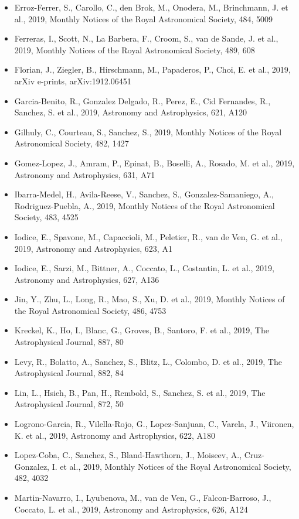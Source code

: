 \documentclass{letter}
\begin{document}
\begin{enumerate}
\begin{itemize}
\item Erroz-Ferrer, S., Carollo, C., den Brok, M., Onodera, M., Brinchmann, J. et al., 2019, Monthly Notices of the Royal Astronomical Society, 484, 5009
\item Ferreras, I., Scott, N., La Barbera, F., Croom, S., van de Sande, J. et al., 2019, Monthly Notices of the Royal Astronomical Society, 489, 608
\item Florian, J., Ziegler, B., Hirschmann, M., Papaderos, P., Choi, E. et al., 2019, arXiv e-prints, arXiv:1912.06451
\item Garcia-Benito, R., Gonzalez Delgado, R., Perez, E., Cid Fernandes, R., Sanchez, S. et al., 2019, Astronomy and Astrophysics, 621, A120
\item Gilhuly, C., Courteau, S., Sanchez, S., 2019, Monthly Notices of the Royal Astronomical Society, 482, 1427
\item Gomez-Lopez, J., Amram, P., Epinat, B., Boselli, A., Rosado, M. et al., 2019, Astronomy and Astrophysics, 631, A71
\item Ibarra-Medel, H., Avila-Reese, V., Sanchez, S., Gonzalez-Samaniego, A., Rodriguez-Puebla, A., 2019, Monthly Notices of the Royal Astronomical Society, 483, 4525
\item Iodice, E., Spavone, M., Capaccioli, M., Peletier, R., van de Ven, G. et al., 2019, Astronomy and Astrophysics, 623, A1
\item Iodice, E., Sarzi, M., Bittner, A., Coccato, L., Costantin, L. et al., 2019, Astronomy and Astrophysics, 627, A136
\item Jin, Y., Zhu, L., Long, R., Mao, S., Xu, D. et al., 2019, Monthly Notices of the Royal Astronomical Society, 486, 4753
\item Kreckel, K., Ho, I., Blanc, G., Groves, B., Santoro, F. et al., 2019, The Astrophysical Journal, 887, 80
\item Levy, R., Bolatto, A., Sanchez, S., Blitz, L., Colombo, D. et al., 2019, The Astrophysical Journal, 882, 84
\item Lin, L., Hsieh, B., Pan, H., Rembold, S., Sanchez, S. et al., 2019, The Astrophysical Journal, 872, 50
\item Logrono-Garcia, R., Vilella-Rojo, G., Lopez-Sanjuan, C., Varela, J., Viironen, K. et al., 2019, Astronomy and Astrophysics, 622, A180
\item Lopez-Coba, C., Sanchez, S., Bland-Hawthorn, J., Moiseev, A., Cruz-Gonzalez, I. et al., 2019, Monthly Notices of the Royal Astronomical Society, 482, 4032
\item Martin-Navarro, I., Lyubenova, M., van de Ven, G., Falcon-Barroso, J., Coccato, L. et al., 2019, Astronomy and Astrophysics, 626, A124

\end{itemize}
\end{enumerate}
\end{document}

